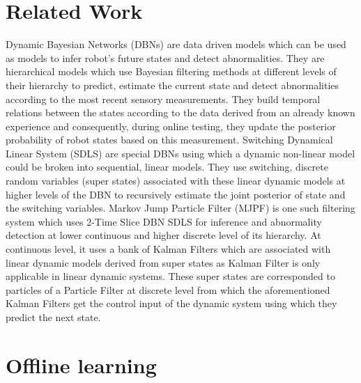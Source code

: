 \documentclass{article}
\begin{document}
\begin{multicols}{2}
\section{Related Work} \label{sec:related-work}
    Dynamic Bayesian Networks (DBNs) \cite{murphy-2002-dynamic-bayesian-networks-representation-inference-and-learning} are data driven models which can be used as models to infer robot's future states and detect abnormalities. They are hierarchical models which use Bayesian filtering methods \cite{chen-2003-bayesian-filtering-from-kalman-filters-to-particle-filters-and-beyond} at different levels of their hierarchy to predict, estimate the current state and detect abnormalities according to the most recent sensory measurements. They build temporal relations between the states according to the data derived from an already known experience and consequently, during online testing, they update the posterior probability of robot states based on this measurement. Switching Dynamical Linear System (SDLS)\cite{sudderth-2009-nonparametric-bayesian-learning-of-switching-linear-dynamical-systems,doucet-2001-particle-filters-for-state-estimation-of-jump-markov-linear-systems,doucet-2001-rao-blackwellised-particle-filtering-for-dynamic-bayesian-networks} are special DBNs using which a dynamic non-linear model could be broken into sequential, linear models. They use switching, discrete random variables (super states) associated with these linear dynamic models at higher levels of the DBN to recursively estimate the joint posterior of state and the switching variables. Markov Jump Particle Filter (MJPF) \cite{baydoun-2018-learning-switching-models-for-abnormality-detection-for-autonomous-driving} is one such filtering system which uses 2-Time Slice DBN \cite{koller-2001-sampling-in-factored-dynamic-systems} SDLS for inference and abnormality detection at lower continuous and higher discrete level of its hierarchy. At continuous level, it uses a bank of Kalman Filters  \cite{kalman-1960-a-new-approach-to-linear-filtering-and-prediction-problems} which are associated with linear dynamic models derived from super states as Kalman Filter is only applicable in linear dynamic systems. These super states are corresponded to particles of a Particle Filter \cite{gordon-1993-novel-approach-to-nonlinear-non-gaussian-bayesian-state-estimation} at discrete level from which the aforementioned Kalman Filters get the control input of the dynamic system using which they predict the next state. 
    
    
\section{Offline learning}\label{sec:learning-phase}

\end{multicols}
\end{document}

